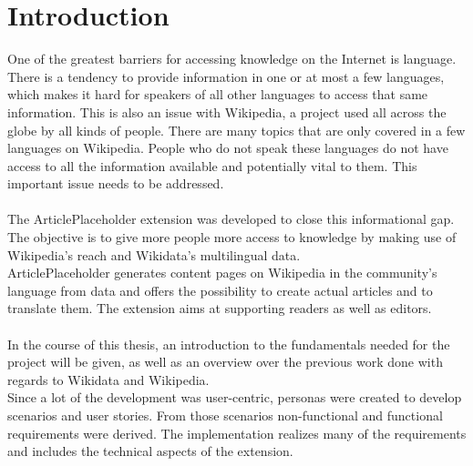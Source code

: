 \chapter{Introduction}

One of the greatest barriers for accessing knowledge on the Internet is language. There is a tendency to provide information in one or at most a few languages, which makes it hard for speakers of all other languages to access that same information. This is also an issue with Wikipedia, a project used all across the globe by all kinds of people. There are many topics that are only covered in a few languages on Wikipedia. People who do not speak these languages do not have access to all the information available and potentially vital to them. This important issue needs to be addressed. \\
\\
The ArticlePlaceholder extension was developed to close this informational gap. The objective is to give more people more access to knowledge by making use of Wikipedia’s reach and Wikidata’s multilingual data. \\
ArticlePlaceholder generates content pages on Wikipedia in the community's language from data and offers the possibility to create actual articles and to translate them. The extension aims at supporting readers as well as editors. \\
\\
In the course of this thesis, an introduction to the fundamentals needed for the project will be given, as well as an overview over the previous work done with regards to Wikidata and Wikipedia. \\
Since a lot of the development was user-centric, personas were created to develop scenarios and user stories. From those scenarios non-functional and functional requirements were derived. The implementation realizes many of the requirements and includes the technical aspects of the extension.
